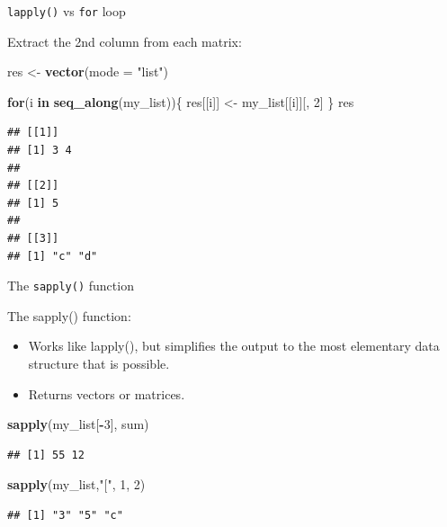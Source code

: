 \documentclass[ignorenonframetext,]{beamer}
\newenvironment{Shaded}{\begin{snugshade}}{\end{snugshade}}
\newcommand{\ControlFlowTok}[1]{\textcolor[rgb]{0.13,0.29,0.53}{\textbf{#1}}}
\newcommand{\DataTypeTok}[1]{\textcolor[rgb]{0.13,0.29,0.53}{#1}}
\newcommand{\DecValTok}[1]{\textcolor[rgb]{0.00,0.00,0.81}{#1}}
\newcommand{\KeywordTok}[1]{\textcolor[rgb]{0.13,0.29,0.53}{\textbf{#1}}}
\newcommand{\NormalTok}[1]{#1}
\newcommand{\OperatorTok}[1]{\textcolor[rgb]{0.81,0.36,0.00}{\textbf{#1}}}
\newcommand{\StringTok}[1]{\textcolor[rgb]{0.31,0.60,0.02}{#1}}
\providecommand{\tightlist}{%
  \setlength{\itemsep}{0pt}\setlength{\parskip}{0pt}}
\begin{document}
\begin{frame}[fragile]{\texttt{lapply()} vs \texttt{for} loop}
\protect\hypertarget{lapply-vs-for-loop}{}

Extract the 2nd column from each matrix:

\begin{Shaded}
\begin{Highlighting}[]
\NormalTok{res <-}\StringTok{ }\KeywordTok{vector}\NormalTok{(}\DataTypeTok{mode =} \StringTok{"list"}\NormalTok{)}

\ControlFlowTok{for}\NormalTok{(i }\ControlFlowTok{in} \KeywordTok{seq_along}\NormalTok{(my_list))\{}
\NormalTok{  res[[i]] <-}\StringTok{ }\NormalTok{my_list[[i]][, }\DecValTok{2}\NormalTok{]}
\NormalTok{\}}
\NormalTok{res}
\end{Highlighting}
\end{Shaded}

\begin{verbatim}
## [[1]]
## [1] 3 4
## 
## [[2]]
## [1] 5
## 
## [[3]]
## [1] "c" "d"
\end{verbatim}

\end{frame}

\begin{frame}[fragile]{The \texttt{sapply()} function}
\protect\hypertarget{the-sapply-function}{}

The sapply() function:

\begin{itemize}
\tightlist
\item
  Works like lapply(), but simplifies the output to the most elementary
  data structure that is possible.
\item
  Returns vectors or matrices.
\end{itemize}

\begin{Shaded}
\begin{Highlighting}[]
\KeywordTok{sapply}\NormalTok{(my_list[}\OperatorTok{-}\DecValTok{3}\NormalTok{], sum)}
\end{Highlighting}
\end{Shaded}

\begin{verbatim}
## [1] 55 12
\end{verbatim}

\begin{Shaded}
\begin{Highlighting}[]
\KeywordTok{sapply}\NormalTok{(my_list,}\StringTok{"["}\NormalTok{, }\DecValTok{1}\NormalTok{, }\DecValTok{2}\NormalTok{)}
\end{Highlighting}
\end{Shaded}

\begin{verbatim}
## [1] "3" "5" "c"
\end{verbatim}

\end{frame}
\end{document}
